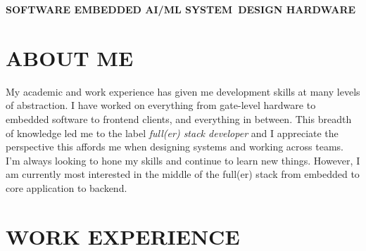 \documentclass[a4paper,nocolors]{cv-friggeri-ben}
\begin{document}

\vspace{-1em}\hspace{-4.33cm}
\textbf{\large{%
\hfill SOFTWARE \hfill {\small\textbullet}%
\hfill EMBEDDED \hfill {\small\textbullet}%
\hfill AI/ML \hfill {\small\textbullet}%
\hfill SYSTEM~DESIGN \hfill {\small\textbullet}%
\hfill HARDWARE \hfill%
}}%

\vspace{-1ex}\hspace{-4.33cm}\hrulefill


\vspace{-8pt}
\section{ABOUT ME}

My academic and work experience has given me development skills at many levels
of abstraction. I have worked on everything from gate-level hardware to
embedded software to frontend clients, and everything in between. This breadth
of knowledge led me to the label \emph{full(er) stack developer} and I
appreciate the perspective this affords me when designing systems and working
across teams. I'm always looking to hone my skills and continue to learn new
things. However, I am currently most interested in the middle of the full(er)
stack from embedded to core application to backend.




\section{WORK EXPERIENCE}
\end{document}
